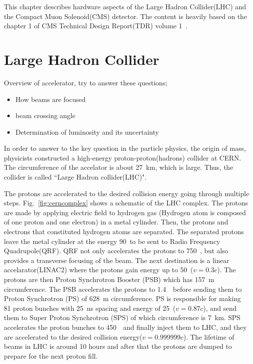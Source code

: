 This chapter describes hardware aspects of the Large Hadron Collider(LHC) 
and the Compact Muon Solenoid(CMS) detector. The content is heavily based on 
the chapter 1 of CMS Technical Design Report(TDR) volume 1~\cite{cmstdr1}.


\section{Large Hadron Collider} 

Overview of accelerator, try to answer these questions;   
\begin{itemize}
  \item How beams are focused 
  \item beam crossing angle 
  \item Determination of luminosity and its uncertainty 
\end{itemize}

In order to answer to the key question in the particle physics, 
the origin of mass, physicists constructed a high-energy 
proton-proton(hadrons) collider at CERN. The circumference of the accelator 
is about 27~km, which is large. Thus, the collider is called 
``Large Hadron collider(LHC)". 

The protons are accelerated to the desired collision energy 
going through multiple steps. 
Fig.~\ref{fig:cerncomplex} shows a schematic of the LHC complex. 
The protons are made by applying electric field to hydrogen gas
(Hydrogen atom is composed of one proton and one electron) 
in a metal cylinder. Then, the protons and electrons that constituted 
hydrogen atoms are separated. The separated protons leave 
the metal cylinder at the energy 90~\keV to be 
sent to Radio Frequency Quadrupole(QRF). QRF not only accelerates 
the protons to 750~\keV, but also provides a transverse focusing 
of the beam. The next destination is a linear accelarator(LINAC2) 
where the protons gain energy up to 50~\MeV($v=0.3c$).
The protons are then Proton Synchrotron Booster (PSB) which has 
157~m circumference. The PSB accelerates the protons to 1.4~\GeV\
before sending them to Proton Synchrotron (PS) of 628~m circumference.
PS is responsible for making 81 proton bunches with 25~ns spacing and energy of 25~\GeV($v=0.87c$),  
and send them to Super Proton Synchrotron (SPS) of which circumference is 7~km. 
SPS accelerates the proton bunches to 450~\GeV\ and finally inject them 
to LHC, and they are accelerated to the desired collision energy($v=0.999999c$). 
The lifetime of beams in LHC is around 10 hours and after that 
the protons are dumped to prepare for the next proton fill. 

